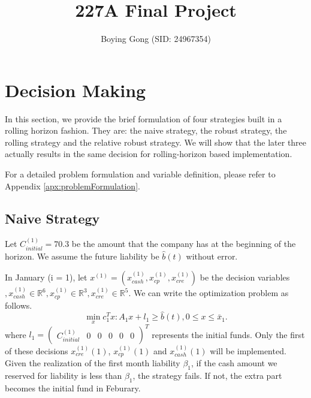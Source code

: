 \documentclass{article}
\title{227A Final Project}
\author{Boying Gong (SID: 24967354)}
\begin{document}
\twocolumn

\maketitle






\section{\textbf{Decision Making}}

In this section, we provide the brief formulation of four strategies built in a rolling horizon fashion. They are: the naive strategy, the robust strategy, the rolling strategy and the relative robust strategy. We will show that the later three actually results in the same decision for rolling-horizon based implementation.

For a detailed problem formulation and variable definition, please refer to Appendix \ref{apx:problemFormulation}.


\subsection{Naive Strategy}

    Let $C^{(1)}_{initial} = 70.3$ be the amount that the company has at the beginning of the horizon. We assume the future liability be $\hat{b}(t)$ without error.

    In January (i = 1), let $x^{(1)}=(x^{(1)}_{cash}, x^{(1)}_{cp}, x^{(1)}_{cre})$ be the decision variables $, x^{(1)}_{cash}\in\mathbb{R}^6, x^{(1)}_{cp}\in\mathbb{R}^3, x^{(1)}_{cre}\in\mathbb{R}^5$. We can write the optimization problem as follows.
    \begin{equation}
        \min_x c_1^Tx: A_1x+l_1\geq\hat{b}(t), 0\leq x\leq \bar{x}_1.
    \end{equation}
    where $l_1=\begin{pmatrix}C^{(1)}_{initial} & 0& 0& 0& 0& 0\end{pmatrix}^T$ represents the initial funds. Only the first of these decisions $x^{(1)}_{cre}(1)$, $x^{(1)}_{cp}(1)$ and $x^{(1)}_{cash}(1)$ will be implemented. Given the realization of the first month liability $\beta_1$, if the cash amount we reserved for liability is less than $\beta_1$, the strategy fails. If not, the extra part becomes the initial fund in Feburary.
\end{document}
